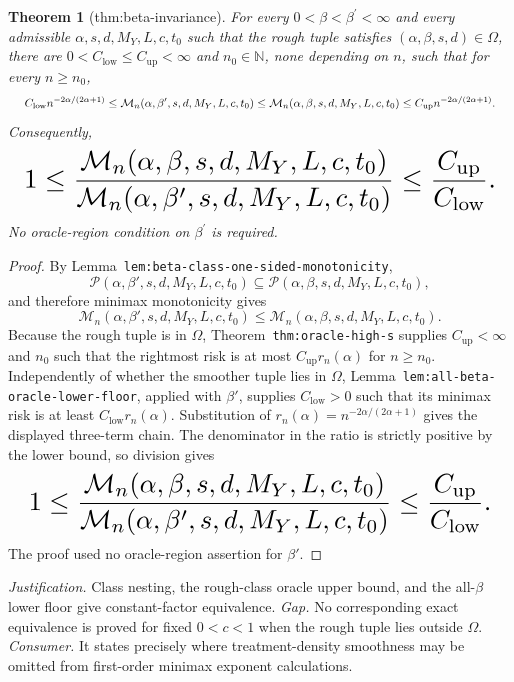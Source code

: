 \documentclass{article}
\newtheorem{theorem}{Theorem}
\begin{document}
\begin{theorem}[thm:beta-invariance]\label{thm:beta-invariance}
For every \(0<\beta<\beta^{\prime}<\infty\) and every admissible \(\alpha,s,d,M_Y,L,c,t_0\) such that the rough tuple satisfies \((\alpha,\beta,s,d)\in\Omega\), there are \(0<C_{\mathrm{low}}\le C_{\mathrm{up}}<\infty\) and \(n_0\in\mathbb N\), none depending on \(n\), such that for every \(n\ge n_0\),
\[
\makebox[\linewidth][c]{\resizebox{0.98\linewidth}{!}{\(\displaystyle C_{\mathrm{low}}n^{-2\alpha/(2\alpha+1)}
\le \mathcal M_n(\alpha,\beta^{\prime},s,d,M_Y,L,c,t_0)
\le \mathcal M_n(\alpha,\beta,s,d,M_Y,L,c,t_0)
\le C_{\mathrm{up}}n^{-2\alpha/(2\alpha+1)}.\)}}
\]
Consequently,
\[
\makebox[\linewidth][c]{\resizebox{0.98\linewidth}{!}{\(\displaystyle 1\le
\frac{\mathcal M_n(\alpha,\beta,s,d,M_Y,L,c,t_0)}{\mathcal M_n(\alpha,\beta^{\prime},s,d,M_Y,L,c,t_0)}
\le \frac{C_{\mathrm{up}}}{C_{\mathrm{low}}}.\)}}
\]
No oracle-region condition on \(\beta^{\prime}\) is required.
\end{theorem}
\begin{proof}
By Lemma~\texttt{lem:beta-class-one-sided-monotonicity},
\[
\mathcal P(\alpha,\beta',s,d,M_Y,L,c,t_0)\subseteq\mathcal P(\alpha,\beta,s,d,M_Y,L,c,t_0),
\]
and therefore minimax monotonicity gives
\[
\mathcal M_n(\alpha,\beta',s,d,M_Y,L,c,t_0)\le\mathcal M_n(\alpha,\beta,s,d,M_Y,L,c,t_0).
\]
Because the rough tuple is in \(\Omega\), Theorem~\texttt{thm:oracle-high-s} supplies \(C_{\mathrm{up}}<\infty\) and \(n_0\) such that the rightmost risk is at most \(C_{\mathrm{up}}r_n(\alpha)\) for \(n\ge n_0\). Independently of whether the smoother tuple lies in \(\Omega\), Lemma~\texttt{lem:all-beta-oracle-lower-floor}, applied with \(\beta'\), supplies \(C_{\mathrm{low}}>0\) such that its minimax risk is at least \(C_{\mathrm{low}}r_n(\alpha)\). Substitution of \(r_n(\alpha)=n^{-2\alpha/(2\alpha+1)}\) gives the displayed three-term chain. The denominator in the ratio is strictly positive by the lower bound, so division gives
\[
\makebox[\linewidth][c]{\resizebox{0.98\linewidth}{!}{\par\noindent \makebox[\linewidth][c]{\resizebox{0.98\linewidth}{!}{\(\displaystyle \displaystyle 1\le\frac{\mathcal M_n(\alpha,\beta,s,d,M_Y,L,c,t_0)}{\mathcal M_n(\alpha,\beta',s,d,M_Y,L,c,t_0)}\le\frac{C_{\mathrm{up}}}{C_{\mathrm{low}}}.\)}}\par\noindent}}
\]
The proof used no oracle-region assertion for \(\beta'\).
\end{proof}
\par\smallskip\noindent \textit{Justification.} Class nesting, the rough-class oracle upper bound, and the all-\(\beta\) lower floor give constant-factor equivalence. \textit{Gap.} No corresponding exact equivalence is proved for fixed \(0<c<1\) when the rough tuple lies outside \(\Omega\). \textit{Consumer.} It states precisely where treatment-density smoothness may be omitted from first-order minimax exponent calculations.
\end{document}
